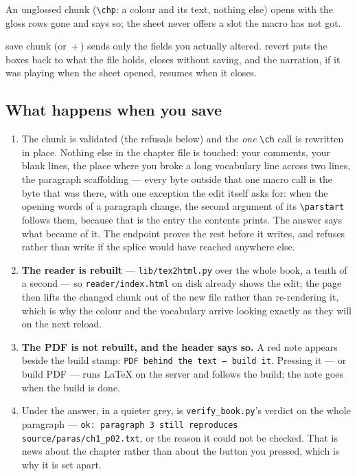 \documentclass[11pt,oneside]{report}
\newcommand{\file}[1]{\texttt{#1}}
\newcommand{\key}[1]{\textsf{\small\fbox{#1}}}
\newcommand{\menu}[1]{\textsf{#1}}
\begin{document}
An unglossed chunk (\verb|\chp|: a colour and its text, nothing else) opens
with the gloss rows gone and says so; the sheet never offers a slot the macro
has not got.

\menu{save chunk} (or \key{Ctrl}\,+\,\key{$\hookleftarrow$}) sends only the
fields you actually altered. \menu{revert} puts the boxes back to what the
file holds, \key{Esc} closes without saving, and the narration, if it was
playing when the sheet opened, resumes when it closes.

\subsection*{What happens when you save}

\begin{enumerate}
\item The chunk is validated (the refusals below) and the \emph{one}
  \verb|\ch| call is rewritten in place. Nothing else in the chapter file is
  touched: your comments, your blank lines, the place where you broke a long
  vocabulary line across two lines, the paragraph scaffolding --- every byte
  outside that one macro call is the byte that was there, with one exception
  the edit itself asks for: when the opening words of a paragraph change, the
  second argument of its \verb|\parstart| follows them, because that is the
  entry the contents prints. The answer says what became of it. The endpoint
  proves the rest before it writes, and refuses rather than write if the
  splice would have reached anywhere else.
\item \textbf{The reader is rebuilt} --- \file{lib/tex2html.py} over the whole
  book, a tenth of a second --- so \file{reader/index.html} on disk already
  shows the edit; the page then lifts the changed chunk out of the new file
  rather than re-rendering it, which is why the colour and the vocabulary
  arrive looking exactly as they will on the next reload.
\item \textbf{The PDF is not rebuilt, and the header says so.} A red note
  appears beside the build stamp: \texttt{PDF behind the text --- build it}.
  Pressing it --- or \menu{build PDF} --- runs LaTeX on the server and follows
  the build; the note goes when the build is done.
\item Under the answer, in a quieter grey, is \file{verify\_book.py}'s verdict
  on the whole paragraph --- \texttt{ok: paragraph~3 still reproduces
  source/paras/ch1\_p02.txt}, or the reason it could not be checked. That is
  news about the chapter rather than about the button you pressed, which is
  why it is set apart.
\end{enumerate}
\end{document}
